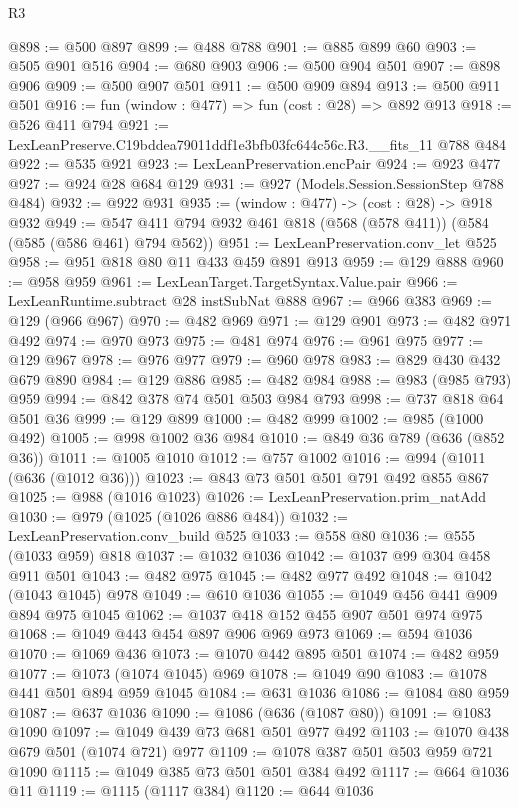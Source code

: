 \begin{lexlean}{R3}
\begin{coremodule}
@898 := @500 @897
@899 := @488 @788
@901 := @885 @899 @60
@903 := @505 @901 @516
@904 := @680 @903
@906 := @500 @904 @501
@907 := @898 @906
@909 := @500 @907 @501
@911 := @500 @909 @894
@913 := @500 @911 @501
@916 := fun (window : @477) => fun (cost : @28) => @892 @913
@918 := @526 @411 @794
@921 := LexLeanPreserve.C19bddea79011ddf1e3bfb03fc644c56c.R3.__fits_11 @788 @484
@922 := @535 @921
@923 := LexLeanPreservation.encPair
@924 := @923 @477
@927 := @924 @28 @684 @129
@931 := @927 (Models.Session.SessionStep @788 @484)
@932 := @922 @931
@935 := (window : @477) -> (cost : @28) -> @918 @932
@949 := @547 @411 @794 @932 @461 @818 (@568 (@578 @411)) (@584 (@585 (@586 @461) @794 @562))
@951 := LexLeanPreservation.conv_let @525
@958 := @951 @818 @80 @11 @433 @459 @891 @913
@959 := @129 @888
@960 := @958 @959
@961 := LexLeanTarget.TargetSyntax.Value.pair
@966 := LexLeanRuntime.subtract @28 instSubNat @888
@967 := @966 @383
@969 := @129 (@966 @967)
@970 := @482 @969
@971 := @129 @901
@973 := @482 @971 @492
@974 := @970 @973
@975 := @481 @974
@976 := @961 @975
@977 := @129 @967
@978 := @976 @977
@979 := @960 @978
@983 := @829 @430 @432 @679 @890
@984 := @129 @886
@985 := @482 @984
@988 := @983 (@985 @793) @959
@994 := @842 @378 @74 @501 @503 @984 @793
@998 := @737 @818 @64 @501 @36
@999 := @129 @899
@1000 := @482 @999
@1002 := @985 (@1000 @492)
@1005 := @998 @1002 @36 @984
@1010 := @849 @36 @789 (@636 (@852 @36))
@1011 := @1005 @1010
@1012 := @757 @1002
@1016 := @994 (@1011 (@636 (@1012 @36)))
@1023 := @843 @73 @501 @501 @791 @492 @855 @867
@1025 := @988 (@1016 @1023)
@1026 := LexLeanPreservation.prim_natAdd
@1030 := @979 (@1025 (@1026 @886 @484))
@1032 := LexLeanPreservation.conv_build @525
@1033 := @558 @80
@1036 := @555 (@1033 @959) @818
@1037 := @1032 @1036
@1042 := @1037 @99 @304 @458 @911 @501
@1043 := @482 @975
@1045 := @482 @977 @492
@1048 := @1042 (@1043 @1045) @978
@1049 := @610 @1036
@1055 := @1049 @456 @441 @909 @894 @975 @1045
@1062 := @1037 @418 @152 @455 @907 @501 @974 @975
@1068 := @1049 @443 @454 @897 @906 @969 @973
@1069 := @594 @1036
@1070 := @1069 @436
@1073 := @1070 @442 @895 @501
@1074 := @482 @959
@1077 := @1073 (@1074 @1045) @969
@1078 := @1049 @90
@1083 := @1078 @441 @501 @894 @959 @1045
@1084 := @631 @1036
@1086 := @1084 @80 @959
@1087 := @637 @1036
@1090 := @1086 (@636 (@1087 @80))
@1091 := @1083 @1090
@1097 := @1049 @439 @73 @681 @501 @977 @492
@1103 := @1070 @438 @679 @501 (@1074 @721) @977
@1109 := @1078 @387 @501 @503 @959 @721 @1090
@1115 := @1049 @385 @73 @501 @501 @384 @492
@1117 := @664 @1036 @11
@1119 := @1115 (@1117 @384)
@1120 := @644 @1036

\end{coremodule}
\end{lexlean}
